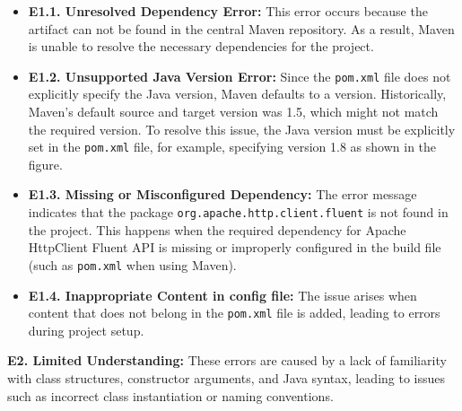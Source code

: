 \begin{itemize}[left=10pt]
    \item \textbf{E1.1. Unresolved Dependency Error:}  
    This error occurs because the artifact can not be found in the central Maven repository. As a result, Maven is unable to resolve the necessary dependencies for the project.
    
    \item \textbf{E1.2. Unsupported Java Version Error:}  
    Since the \texttt{pom.xml} file does not explicitly specify the Java version, Maven defaults to a version. Historically, Maven's default source and target version was 1.5, which might not match the required version. To resolve this issue, the Java version must be explicitly set in the \texttt{pom.xml} file, for example, specifying version 1.8 as shown in the figure.
    
    \item \textbf{E1.3. Missing or Misconfigured Dependency:}  
    The error message indicates that the package \texttt{org.apache.http.client.fluent} is not found in the project. This happens when the required dependency for Apache HttpClient Fluent API is missing or improperly configured in the build file (such as \texttt{pom.xml} when using Maven).
    
    \item \textbf{E1.4. Inappropriate Content in config file:}  
    The issue arises when content that does not belong in the \texttt{pom.xml} file is added, leading to errors during project setup.
\end{itemize}

\textbf{E2. Limited Understanding:}
These errors are caused by a lack of familiarity with class structures, constructor arguments, and Java syntax, leading to issues such as incorrect class instantiation or naming conventions.

